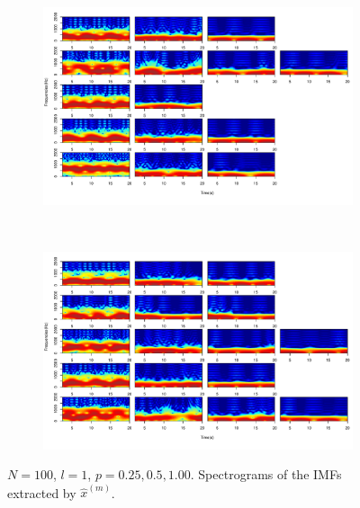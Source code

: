 \documentclass[11pt, a4paper]{article} %
\begin{document}
\begin{figure}
\begin{subfigure}{1.1\textwidth}
  \centering
  \includegraphics[width=\linewidth]{spectro_N100_l1_IMF_m_1_5.pdf}
  \label{fig:sfig1}
\end{subfigure}\\
\begin{subfigure}{1.1\textwidth}
  \centering
  \includegraphics[width=\linewidth]{spectro_N100_l1_IMF_m_6_10.pdf}
  \label{fig:sfig2}
\end{subfigure}
\label{fig1}
\caption{$N = 100$, $l = 1$, $p = 0.25, 0.5, 1.00$. Spectrograms of the IMFs extracted by $\hat{x}^{(m)}$.}
\end{figure}

\restoregeometry




\end{document}
